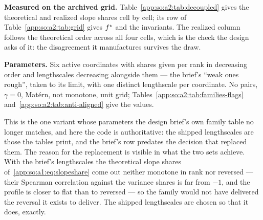 \textbf{Measured on the archived grid.} Table~\ref{app:so:a2:tab:decoupled}
gives the theoretical and realized slope shares cell by cell; its row of
Table~\ref{app:so:a2:tab:grid} gives $f^\star$ and the invariants. The realized
column follows the theoretical order across all four cells, which is the check
the design asks of it: the disagreement it manufactures survives the draw.

\begin{table}[htbp]
  \centering
  \caption[The four cells of ]{
  The four cells of : each cell's share and lengthscale, its
  unnormalized theoretical slope energy $s\cdot5/(3\ell^2\vell{\ell})$, the
  theoretical slope share that energy normalizes to over all eight active
  coordinates, and the realized slope share label $g$ averaged over the seeds.
  Mixed check class. Every column but the last is closed form --- a
  deterministic function of the specification and of the
  quadrature~\eqref{app:so:a1:eq:vell} --- and no draw enters it. The last
  column is draw-dependent: measured on
  the archived grid, seeds $0$--$9$, $D=\SOnumStudyD$, this machine's BLAS\@. The
  cell list is derived from the specification's own distinct $(s,\ell)$ pairs,
  so a cell added to the family cannot be silently dropped from the
  table.}\label{app:so:a2:tab:decoupled}
  \small\setlength{\tabcolsep}{3pt}
  
\end{table}

\label{app:so:a2:anti-aligned}

\textbf{Parameters.} Six active coordinates with shares given per rank in
decreasing order and lengthscales decreasing alongside them --- the brief's
``weak ones rough'', taken to its limit, with one distinct lengthscale per
coordinate. No pairs, $\gamma=0$, Mat\'ern, not monotone, unit grid;
Tables~\ref{app:so:a2:tab:families-flags} and~\ref{app:so:a2:tab:anti-aligned}
give the values.

This is the one variant whose parameters the design brief's own family table no
longer matches, and here the code is authoritative: the shipped lengthscales are
those the tables print, and the brief's row predates the decision that replaced
them. The reason for the replacement is visible in what the two sets achieve.
With the brief's lengthscales the theoretical slope shares
of~\eqref{app:so:a1:eq:slopeshare} come out neither monotone in rank nor
reversed --- their Spearman correlation against the variance shares is far from
$-1$, and the profile is closer to flat than to reversed --- so the family would
not have delivered the reversal it exists to deliver. The shipped lengthscales
are chosen so that it does, exactly.

